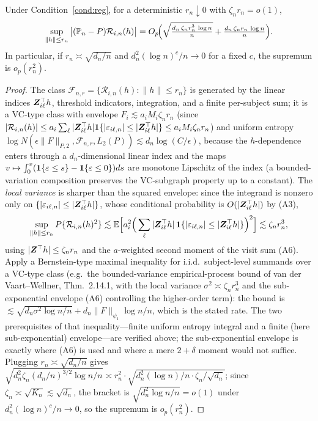 \begin{lemma}\label{lem:knight}
Under Condition~\ref{cond:reg}, for a deterministic $r_n\downarrow0$ with
$\zeta_n r_n=o(1)$,
\[
\sup_{\|h\|\le r_n}\big|(\mathbb{P}_n-P)\mathcal R_{i,n}(h)\big|
=O_p\!\Big(\sqrt{\tfrac{d_n\,\zeta_n r_n^3\,\log n}{n}}
+\tfrac{d_n\,\zeta_n r_n\,\log n}{n}\Big).
\]
In particular, if $r_n\asymp\sqrt{d_n/n}$ and $d_n^2(\log n)^c/n\to0$ for a
fixed $c$, the supremum is $o_p(r_n^2)$.
\end{lemma}
\begin{proof}
The class $\mathcal F_{n,r}=\{\mathcal R_{i,n}(h):\|h\|\le r_n\}$ is generated by
the linear indices $\bm{Z}_{i\ell}^\top h$, threshold indicators, integration, and a
finite per-subject sum; it is a VC-type class with envelope
$F_{i}\lesssim a_i M_i\zeta_n r_n$ (since $|\mathcal R_{i,n}(h)|\le a_i\sum_\ell
|\bm{Z}_{i\ell}^\top h|\mathbf{1}\{|\varepsilon_{i\ell,n}|\le|\bm{Z}_{i\ell}^\top h|\}\le a_i M_i
\zeta_n r_n$) and uniform entropy
$\log N(\epsilon\|F\|_{P,2},\mathcal F_{n,r},L_2(P))\lesssim d_n\log(C/\epsilon)$,
because the $h$-dependence enters through a $d_n$-dimensional linear index and
the maps $v\mapsto\int_0^v(\mathbf{1}\{\varepsilon\le s\}-\mathbf{1}\{\varepsilon\le0\})ds$ are
monotone Lipschitz of the index (a bounded-variation composition preserves the
VC-subgraph property up to a constant). The \emph{local variance} is sharper
than the squared envelope: since the integrand is nonzero only on
$\{|\varepsilon_{i\ell,n}|\le|\bm{Z}_{i\ell}^\top h|\}$, whose conditional
probability is $O(|\bm{Z}_{i\ell}^\top h|)$ by (A3),
\[
\sup_{\|h\|\le r_n}P\{\mathcal R_{i,n}(h)^2\}
\lesssim\mathbb{E}\Big[a_i^2\Big(\sum_\ell|\bm{Z}_{i\ell}^\top h|\,
\mathbf{1}\{|\varepsilon_{i\ell,n}|\le|\bm{Z}_{i\ell}^\top h|\}\Big)^2\Big]
\lesssim\zeta_n r_n^3,
\]
using $|\bm{Z}^\top h|\le\zeta_n r_n$ and the $a$-weighted second moment of the
visit sum (A6). Apply a Bernstein-type maximal inequality for i.i.d.\
subject-level summands over a VC-type class (e.g.\ the bounded-variance
empirical-process bound of van der Vaart--Wellner, Thm.\ 2.14.1, with the local
variance $\sigma^2\asymp\zeta_n r_n^3$ and the sub-exponential envelope (A6)
controlling the higher-order term): the bound is
$\lesssim\sqrt{d_n\sigma^2\log n/n}+d_n\|F\|_{\psi_1}\log n/n$, which is the
stated rate. The two prerequisites of that inequality---finite uniform entropy
integral and a finite (here sub-exponential) envelope---are verified above; the
sub-exponential envelope is exactly where (A6) is used and where a mere
$2{+}\delta$ moment would not suffice. Plugging $r_n\asymp\sqrt{d_n/n}$ gives
$\sqrt{d_n^2\zeta_n(d_n/n)^{3/2}\log n/n}\asymp r_n^2\cdot
\sqrt{d_n^2(\log n)/n\cdot\zeta_n/\sqrt{d_n}}$; since $\zeta_n\asymp\sqrt{K_n}
\lesssim\sqrt{d_n}$, the bracket is $\sqrt{d_n^2\log n/n}=o(1)$ under
$d_n^2(\log n)^c/n\to0$, so the supremum is $o_p(r_n^2)$.
\end{proof}

